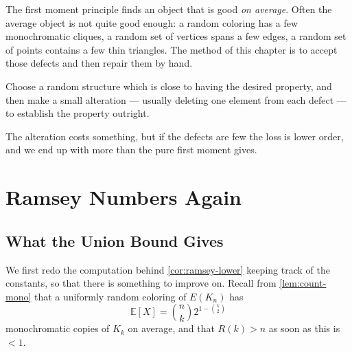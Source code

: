 The first moment principle finds an object that is good \emph{on average}. Often the average object is not quite good enough: a random coloring has a few monochromatic cliques, a random set of vertices spans a few edges, a random set of points contains a few thin triangles. The method of this chapter is to accept those defects and then repair them by hand.

\begin{moral}
    Choose a random structure which is close to having the desired property, and then make a small alteration --- usually deleting one element from each defect --- to establish the property outright.
\end{moral}

The alteration costs something, but if the defects are few the loss is lower order, and we end up with more than the pure first moment gives.
\begin{center}
\end{center}

\section{Ramsey Numbers Again}\label{sec:ramsey-alteration}

\subsection{What the Union Bound Gives}

We first redo the computation behind \autoref{cor:ramsey-lower} keeping track of the constants, so that there is something to improve on. Recall from \autoref{lem:count-mono} that a uniformly random coloring of \(E(K_n)\) has
\[
    \mathbb{E}[X] = \binom{n}{k} 2^{1 - \binom{k}{2}}
\]
monochromatic copies of \(K_k\) on average, and that \(R(k) > n\) as soon as this is \(< 1\).

